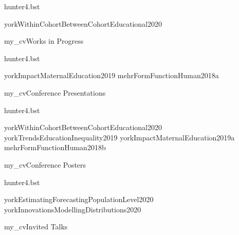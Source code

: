 \documentclass[letterpaper,11pt]{article}
\begin{document}

{hunter4.bst}

\nocite{wip}{yorkWithinCohortBetweenCohortEducational2020}

{my_cv}{Works in Progress}


{hunter4.bst}

\nocite{pres}{yorkImpactMaternalEducation2019}
\nocite{pres}{mehrFormFunctionHuman2018a}

{my_cv}{Conference Presentations}


{hunter4.bst}

\nocite{post}{yorkWithinCohortBetweenCohortEducational2020}
\nocite{post}{yorkTrendsEducationInequality2019}
\nocite{post}{yorkImpactMaternalEducation2019a}
\nocite{post}{mehrFormFunctionHuman2018b}


{my_cv}{Conference Posters}


{hunter4.bst}

\nocite{talks}{yorkEstimatingForecastingPopulationLevel2020}
\nocite{talks}{yorkInnovationsModellingDistributions2020}

{my_cv}{Invited Talks}

\end{document}
